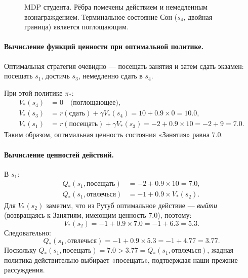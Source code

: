 \begin{example}
\begin{figure}[ht]
\caption{MDP студента. Рёбра помечены действием и немедленным вознаграждением. Терминальное состояние Сон ($s_4$, двойная граница) является поглощающим.}
\label{fig:student-mdp}
\end{figure}

\paragraph{Вычисление функций ценности при оптимальной политике.}
Оптимальная стратегия очевидно — посещать занятия и затем сдать экзамен: посещать $s_1$, достичь $s_3$, немедленно сдать в $s_4$.

При этой политике $\pi_*$:
\begin{align*}
V_*(s_4) &= 0 \quad \mbox{(поглощающее)}, \\
V_*(s_3) &= r(\mbox{сдать}) + \gamma V_*(s_4) = 10 + 0.9 \times 0 = 10.0, \\
V_*(s_1) &= r(\mbox{посещать}) + \gamma V_*(s_3) = -2 + 0.9 \times 10 = -2 + 9 = 7.0.
\end{align*}
Таким образом, оптимальная ценность состояния «Занятия» равна $7.0$.

\paragraph{Вычисление ценностей действий.}
В $s_1$:
\begin{align*}
Q_*(s_1, \mbox{посещать})   &= -2 + 0.9 \times 10 = 7.0, \\
Q_*(s_1, \mbox{отвлечься}) &= -1 + 0.9 \times V_*(s_2).
\end{align*}
Для $V_*(s_2)$ заметим, что из Рутуб оптимальное действие — \emph{выйти} (возвращаясь к Занятиям, имеющим ценность $7.0$), поэтому:
\[
V_*(s_2) = -1 + 0.9 \times 7.0 = -1 + 6.3 = 5.3.
\]
Следовательно:
\[
Q_*(s_1, \mbox{отвлечься}) = -1 + 0.9 \times 5.3 = -1 + 4.77 = 3.77.
\]
Поскольку $Q_*(s_1, \mbox{посещать}) = 7.0 > 3.77 = Q_*(s_1, \mbox{отвлечься})$, жадная политика действительно выбирает «посещать», подтверждая наши прежние рассуждения.


\end{example}
